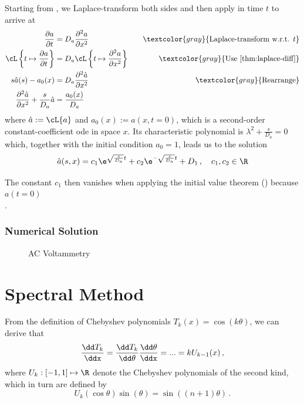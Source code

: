 \documentclass{prettytex/ox/mmsc-special-topic}
\begin{document}
  Starting from , we Laplace-transform both sides and then apply  in time $t$ to arrive at
  \begin{align*}
    \frac{\partial a}{\partial t}                                   & = D_a \frac{\partial^2 a}{\partial x^2} \quad                             & \textcolor{gray}{\text{Laplace-transform w.r.t. } t} \\
    \cL\left\{t \mapsto \frac{\partial a}{\partial t}\right\}       & = D_a \cL\left\{t \mapsto \frac{\partial^2 a}{\partial x^2}\right\} \quad & \textcolor{gray}{\text{Use \Cref{thm:laplace-diff}}} \\
    s \hat{a}(s) - a_0(x)                                           & = D_a \frac{\partial^2 \hat{a}}{\partial x^2} \quad                       & \textcolor{gray}{\text{Rearrange}}                   \\
    \frac{\partial^2 \hat{a}}{\partial x^2} + \frac{s}{D_a} \hat{a} & = \frac{a_0(x)}{D_a}
  \end{align*}
  where $\hat{a} := \cL\{a\}$ and $a_0(x) := a(x, t=0)$, which is a second-order constant-coefficient \glsdesc{ode} in space $x$. Its characteristic polynomial is $\lambda^2 + \frac{s}{D_a} = 0$ which, together with the initial condition $a_0 = 1$, leads us to the solution
  \begin{equation}
    \hat{a}(s, x) = c_1 \e^{\sqrt{\frac{s}{D_a}}t} + c_2 \e^{-\sqrt{\frac{s}{D_a}}t} + D_1\,,\quad c_1, c_2 \in \R
    \label{eq:laplace-solution}
  \end{equation}

  The constant $c_1$ then vanishes when applying the initial value theorem () because $a(t=0)$
  $$$$.

  \subsubsection{Numerical Solution}
  \begin{figure}
    \centering
    \caption{AC Voltammetry}
  \end{figure}

  \section{Spectral Method}
  From the definition of Chebyshev polynomials $T_k(x) = \cos(k\theta)$, we can derive that
  $$\frac{\dd T_k}{\ddx} = \frac{\dd T_k}{\dd\theta} \frac{\dd\theta}{\ddx} = ... = k U_{k-1}(x)\,,$$
  where $U_k: [-1, 1] \mapsto \R$ denote the Chebyshev polynomials of the second kind, which in turn are defined by
  $$U_k(\cos \theta) \sin(\theta) = \sin\left((n+1) \theta\right)\,.$$
\end{document}
